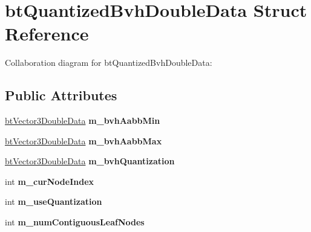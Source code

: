 \hypertarget{structbt_quantized_bvh_double_data}{\section{bt\+Quantized\+Bvh\+Double\+Data Struct Reference}
\label{structbt_quantized_bvh_double_data}
}


Collaboration diagram for bt\+Quantized\+Bvh\+Double\+Data\+:
\subsection*{Public Attributes}
\begin{DoxyCompactItemize}
\item 
\hypertarget{structbt_quantized_bvh_double_data_a7bd89e1cdd66b7fe895b5d49aa35d866}{\hyperlink{structbt_vector3_double_data}{bt\+Vector3\+Double\+Data} {\bfseries m\+\_\+bvh\+Aabb\+Min}}\label{structbt_quantized_bvh_double_data_a7bd89e1cdd66b7fe895b5d49aa35d866}

\item 
\hypertarget{structbt_quantized_bvh_double_data_aa20f8a0f413839885782bc0014e3f0aa}{\hyperlink{structbt_vector3_double_data}{bt\+Vector3\+Double\+Data} {\bfseries m\+\_\+bvh\+Aabb\+Max}}\label{structbt_quantized_bvh_double_data_aa20f8a0f413839885782bc0014e3f0aa}

\item 
\hypertarget{structbt_quantized_bvh_double_data_adca4033b1e6ba0b15407eb63be26e393}{\hyperlink{structbt_vector3_double_data}{bt\+Vector3\+Double\+Data} {\bfseries m\+\_\+bvh\+Quantization}}\label{structbt_quantized_bvh_double_data_adca4033b1e6ba0b15407eb63be26e393}

\item 
\hypertarget{structbt_quantized_bvh_double_data_ab1ebc21cea28e7fb4c7a1652e3ef2934}{int {\bfseries m\+\_\+cur\+Node\+Index}}\label{structbt_quantized_bvh_double_data_ab1ebc21cea28e7fb4c7a1652e3ef2934}

\item 
\hypertarget{structbt_quantized_bvh_double_data_a7c4abc65a4e3308f9a05214ae5f1e821}{int {\bfseries m\+\_\+use\+Quantization}}\label{structbt_quantized_bvh_double_data_a7c4abc65a4e3308f9a05214ae5f1e821}

\item 
\hypertarget{structbt_quantized_bvh_double_data_a69092defbc1086ec7adba38decce0d01}{int {\bfseries m\+\_\+num\+Contiguous\+Leaf\+Nodes}}\label{structbt_quantized_bvh_double_data_a69092defbc1086ec7adba38decce0d01}


\end{DoxyCompactItemize}
